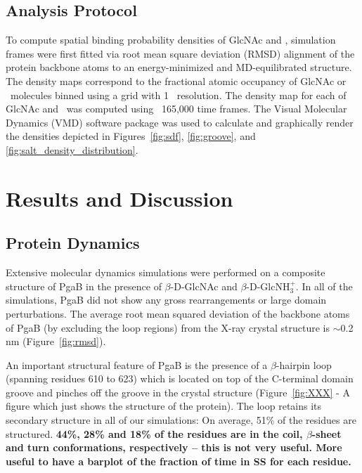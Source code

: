 \subsection*{Analysis Protocol}
To compute spatial binding probability densities of GlcNAc and \glucosamine, simulation frames were first fitted via root mean square deviation (RMSD) alignment of the protein backbone atoms to an energy-minimized and MD-equilibrated structure. The density maps correspond to the fractional atomic occupancy of GlcNAc or \glucosamine\ molecules binned using a grid with 1 \angstrom\ resolution. The density map for each of GlcNAc and \glucosamine\ was computed using ~165,000 time frames. The Visual Molecular Dynamics (VMD) software package\cite{Humphrey:1996to} was used to calculate and graphically render the densities depicted in Figures~\ref{fig:sdf}, \ref{fig:groove}, and \ref{fig:salt_density_distribution}.


\section{Results and Discussion}

\subsection{Protein Dynamics}
Extensive molecular dynamics simulations were performed on a composite structure of PgaB in the presence of $\beta$-D-GlcNAc and $\beta$-D-GlcNH$_{3}^{+}$. In all of the simulations, PgaB did not show any gross rearrangements or large domain perturbations. The average root mean squared deviation of the backbone atoms of PgaB (by excluding the loop regions) from the X-ray crystal structure is $\sim$0.2 nm (Figure~\ref{fig:rmsd}).

An important structural feature of PgaB is the presence of a $\beta$-hairpin loop (spanning residues 610 to 623) which is located on top of the C-terminal domain groove and pinches off the groove in the crystal structure (Figure~\ref{fig:XXX} - A figure which just shows the structure of the protein). The loop retains its secondary structure in all of our simulations: On average, 51\% of the residues are structured. \textbf{44\%, 28\% and 18\% of the residues are in the coil, $\beta$-sheet and turn conformations, respectively -- this is not very useful. More useful to have a barplot of the fraction of time in SS for each residue.}

